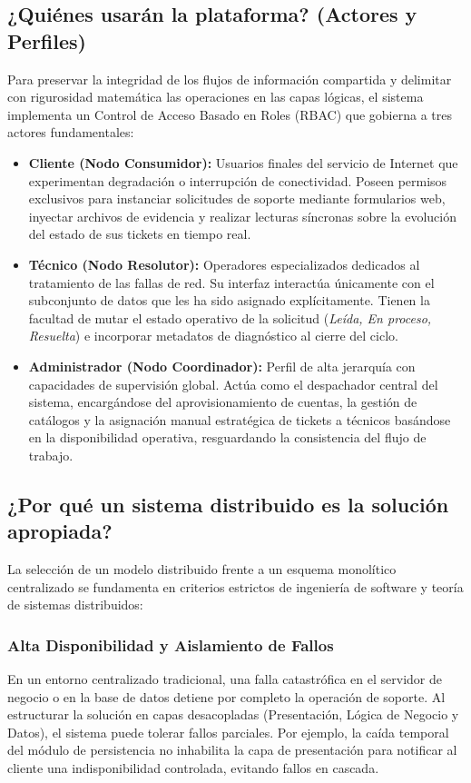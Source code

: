 \documentclass[12pt,letterpaper]{article}
\begin{document}
\subsection{¿Quiénes usarán la plataforma? (Actores y Perfiles)}
Para preservar la integridad de los flujos de información compartida y delimitar con rigurosidad matemática las operaciones en las capas lógicas, el sistema implementa un Control de Acceso Basado en Roles (RBAC) que gobierna a tres actores fundamentales:
\begin{itemize}
    \item \textbf{Cliente (Nodo Consumidor):} Usuarios finales del servicio de Internet que experimentan degradación o interrupción de conectividad. Poseen permisos exclusivos para instanciar solicitudes de soporte mediante formularios web, inyectar archivos de evidencia y realizar lecturas síncronas sobre la evolución del estado de sus tickets en tiempo real.
    \item \textbf{Técnico (Nodo Resolutor):} Operadores especializados dedicados al tratamiento de las fallas de red. Su interfaz interactúa únicamente con el subconjunto de datos que les ha sido asignado explícitamente. Tienen la facultad de mutar el estado operativo de la solicitud (\textit{Leída, En proceso, Resuelta}) e incorporar metadatos de diagnóstico al cierre del ciclo.
    \item \textbf{Administrador (Nodo Coordinador):} Perfil de alta jerarquía con capacidades de supervisión global. Actúa como el despachador central del sistema, encargándose del aprovisionamiento de cuentas, la gestión de catálogos y la asignación manual estratégica de tickets a técnicos basándose en la disponibilidad operativa, resguardando la consistencia del flujo de trabajo.
\end{itemize}

\subsection{¿Por qué un sistema distribuido es la solución apropiada?}
La selección de un modelo distribuido frente a un esquema monolítico centralizado se fundamenta en criterios estrictos de ingeniería de software y teoría de sistemas distribuidos:

\subsubsection{Alta Disponibilidad y Aislamiento de Fallos}
En un entorno centralizado tradicional, una falla catastrófica en el servidor de negocio o en la base de datos detiene por completo la operación de soporte. Al estructurar la solución en capas desacopladas (Presentación, Lógica de Negocio y Datos), el sistema puede tolerar fallos parciales. Por ejemplo, la caída temporal del módulo de persistencia no inhabilita la capa de presentación para notificar al cliente una indisponibilidad controlada, evitando fallos en cascada.
\end{document}
